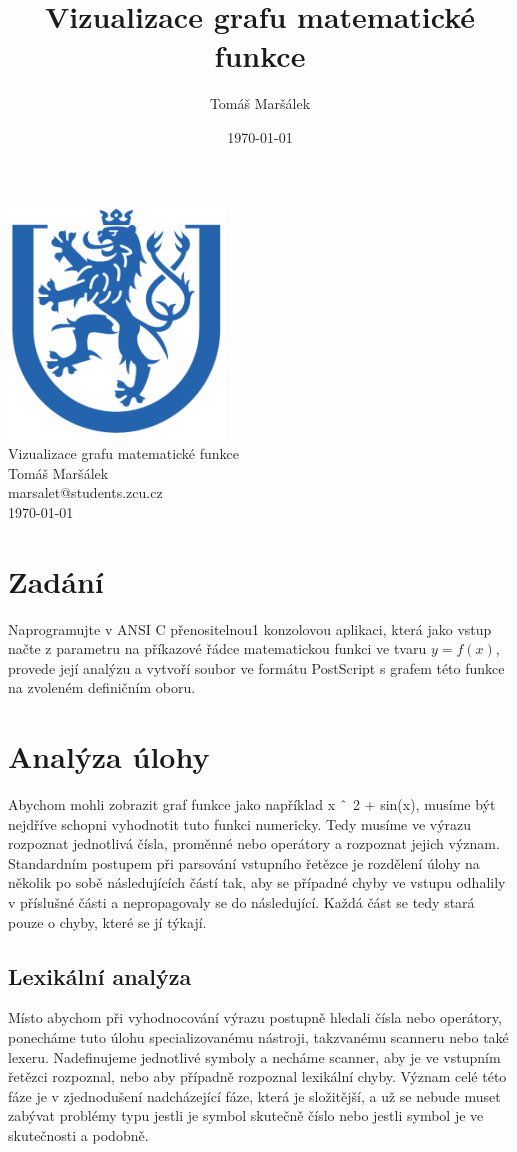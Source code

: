 \documentclass[11pt]{article}
\title{Vizualizace grafu matematické funkce}
\author{Tomáš Maršálek}
\date{\today}
\newcommand\CARET{\mathbin{\char`\^}}
\begin{document}
\begin{titlepage}
\begin{center}
	\includegraphics{res/znak_vzor.png} \\[2cm]
	\huge{Vizualizace grafu matematické funkce} \\[2cm]
	\Large{Tomáš Maršálek} \\
	\large{marsalet@students.zcu.cz} \\[1cm]
	\normalsize{\today}
\end{center}
\end{titlepage}

\section{Zadání}
Naprogramujte v ANSI C přenositelnou1 konzolovou aplikaci, která jako vstup
načte z parametru na příkazové řádce matematickou funkci ve tvaru $y = f(x)$,
provede její analýzu a vytvoří soubor ve formátu PostScript s grafem této
funkce na zvoleném definičním oboru.

\section{Analýza úlohy}
Abychom mohli zobrazit graf funkce jako například x $\CARET$ 2 + sin(x), musíme
být nejdříve schopni vyhodnotit tuto funkci numericky. Tedy musíme ve výrazu
rozpoznat jednotlivá čísla, proměnné nebo operátory a rozpoznat jejich význam.
Standardním postupem při parsování vstupního řetězce je rozdělení úlohy na
několik po sobě následujících částí tak, aby se případné chyby ve vstupu
odhalily v příslušné části a nepropagovaly se do následující. Každá část
se tedy stará pouze o chyby, které se jí týkají.

\subsection{Lexikální analýza}
Místo abychom při vyhodnocování výrazu postupně hledali čísla nebo operátory,
ponecháme tuto úlohu specializovanému nástroji, takzvanému scanneru nebo také
lexeru.  Nadefinujeme jednotlivé symboly a necháme scanner, aby je ve vstupním
řetězci rozpoznal, nebo aby případně rozpoznal lexikální chyby.  Význam celé
této fáze je v zjednodušení nadcházející fáze, která je složitější, a už se
nebude muset zabývat problémy typu jestli je symbol skutečně číslo nebo jestli
symbol  je ve skutečnosti  a podobně.
\end{document}
